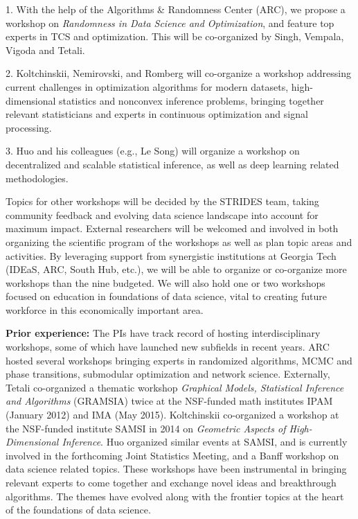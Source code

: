 \documentclass[12pt]{article}
\begin{document}
1. With the help of the Algorithms \& Randomness Center (ARC), we propose a workshop
on {\em Randomness in Data Science and Optimization}, and feature top experts in
TCS and optimization. This will be co-organized by
Singh, Vempala, Vigoda and Tetali.

2.  Koltchinskii, Nemirovski, and Romberg will co-organize a workshop addressing current challenges in optimization algorithms for modern datasets,  high-dimensional statistics and nonconvex inference problems, bringing together relevant statisticians and experts in continuous optimization and signal processing.

3. Huo and his colleagues (e.g., Le Song) will organize a workshop on decentralized and scalable statistical inference, as well as deep learning related methodologies.

\medskip

Topics for other workshops will be decided by the STRIDES team, taking community feedback and
evolving data science landscape into account for maximum impact. External researchers will be welcomed and involved in both organizing the scientific program of the workshops as well as
plan topic areas and activities. By leveraging support from synergistic institutions at Georgia Tech (IDEaS, ARC, South Hub, etc.), we will be able to organize or co-organize more workshops than the nine budgeted. We will also hold one or two workshops focused on
education in foundations of data science, vital to creating future workforce in this economically important area.

\noindent
{\bf Prior experience:}
The PIs have track record of hosting interdisciplinary workshops, some of which have launched new subfields in recent years. ARC hosted several workshops bringing experts in
randomized algorithms, MCMC and phase transitions, submodular optimization and network
science. Externally, Tetali co-organized a thematic workshop  {\em Graphical Models, Statistical Inference and Algorithms} (GRAMSIA) twice at the NSF-funded math institutes
IPAM (January 2012) and IMA (May 2015). Koltchinskii co-organized a workshop at the
NSF-funded institute SAMSI in 2014 on {\em Geometric Aspects of High-Dimensional Inference}.
Huo organized similar events at SAMSI, and is currently involved in the forthcoming
Joint Statistics Meeting, and a Banff workshop on data science related topics.
These workshops have been instrumental in bringing relevant experts  to come together and exchange novel ideas and breakthrough algorithms. The themes have evolved along with the frontier topics at the heart of the foundations of data science.

\clearpage

\normalbaselineskip
{}



%

\end{document}
